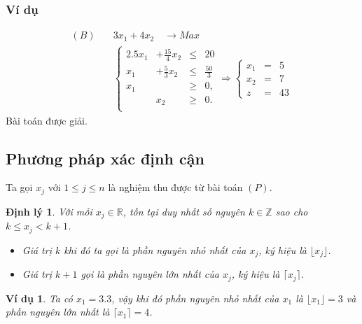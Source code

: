 \documentclass[12pt,a4paper]{report}
\newtheorem{dl}{Định lý}
\newtheorem{vd}{Ví dụ}
\begin{document}
\subsubsection*{Ví dụ}
        \begin{equation} \label{baitoannguyenhet}
        \begin{split}
            (B) \quad & 3x_1 + 4x_2 \quad \longrightarrow Max \\
            & \left\{\begin{array} {cccc}
            2.5x_1 &+ \frac{15}{4}x_2 &\leq& 20 \\
            x_1 &+ \frac{5}{3}x_2 &\leq& \frac{50}{3} \\
            x_1 &&\geq &0, \\
            &x_2 &\geq& 0. \\
            \end{array}\right.
            \Longrightarrow
            \left\{\begin{array}{ccc}
            x_1 &= &5 \\
            x_2 &= &7 \\
            z& =&43
        \end{array}\right.
        \end{split}
        \end{equation}
    Bài toán được giải.

\subsection*{Phương pháp xác định cận}
Ta gọi $x_j$ với $1 \leq j \leq n$ là nghiệm thu được từ bài toán $(P)$.
\begin{dl}\label{cmnguyen}
	\phantom{}
Với mỗi $x_j \in \mathbb{R}$, tồn tại duy nhất số nguyên $k \in \mathbb{Z}$ sao cho $k \leq x_j < k+1$.
\begin{itemize}
\item Giá trị $k$ khi đó ta gọi là phần nguyên nhỏ nhất của $x_j$, ký hiệu là $\lfloor x_j \rfloor$.
\item Giá trị $k+1$ gọi là phần nguyên lớn nhất của $x_j$, ký hiệu là $\lceil x_j \rceil$.
\end{itemize}
\end{dl}

\begin{vd}
Ta có $x_1=3.3$, vậy khi đó phần nguyên nhỏ nhất của $x_1$ là $\lfloor x_1 \rfloor = 3$ và phần nguyên lớn nhất là $\lceil x_1 \rceil =4$.
\end{vd}
\end{document}

